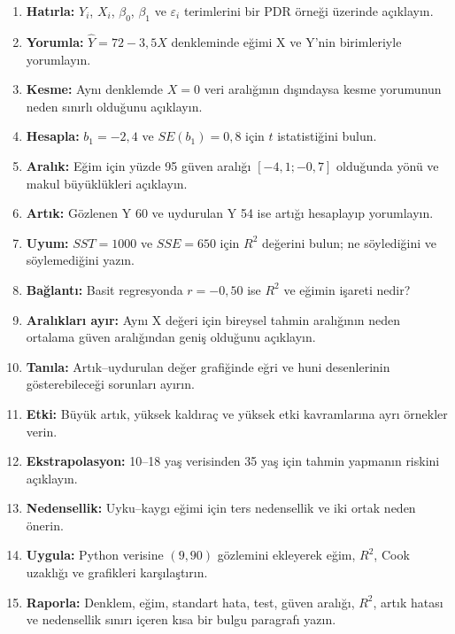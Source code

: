 \begin{enumerate}
\renewcommand{\labelenumi}{\textbf{\Alph{enumi}.}}
  \item \textbf{Hatırla:} $Y_i$, $X_i$, $\beta_0$, $\beta_1$ ve $\varepsilon_i$ terimlerini bir PDR örneği üzerinde açıklayın.
  \item \textbf{Yorumla:} $\widehat Y=72-3{,}5X$ denkleminde eğimi X ve Y'nin birimleriyle yorumlayın.
  \item \textbf{Kesme:} Aynı denklemde $X=0$ veri aralığının dışındaysa kesme yorumunun neden sınırlı olduğunu açıklayın.
  \item \textbf{Hesapla:} $b_1=-2{,}4$ ve $SE(b_1)=0{,}8$ için $t$ istatistiğini bulun.
  \item \textbf{Aralık:} Eğim için yüzde 95 güven aralığı $[-4{,}1;-0{,}7]$ olduğunda yönü ve makul büyüklükleri açıklayın.
  \item \textbf{Artık:} Gözlenen Y 60 ve uydurulan Y 54 ise artığı hesaplayıp yorumlayın.
  \item \textbf{Uyum:} $SST=1000$ ve $SSE=650$ için $R^2$ değerini bulun; ne söylediğini ve söylemediğini yazın.
  \item \textbf{Bağlantı:} Basit regresyonda $r=-0{,}50$ ise $R^2$ ve eğimin işareti nedir?
  \item \textbf{Aralıkları ayır:} Aynı X değeri için bireysel tahmin aralığının neden ortalama güven aralığından geniş olduğunu açıklayın.
  \item \textbf{Tanıla:} Artık--uydurulan değer grafiğinde eğri ve huni desenlerinin gösterebileceği sorunları ayırın.
  \item \textbf{Etki:} Büyük artık, yüksek kaldıraç ve yüksek etki kavramlarına ayrı örnekler verin.
  \item \textbf{Ekstrapolasyon:} 10--18 yaş verisinden 35 yaş için tahmin yapmanın riskini açıklayın.
  \item \textbf{Nedensellik:} Uyku--kaygı eğimi için ters nedensellik ve iki ortak neden önerin.
  \item \textbf{Uygula:} Python verisine $(9,90)$ gözlemini ekleyerek eğim, $R^2$, Cook uzaklığı ve grafikleri karşılaştırın.
  \item \textbf{Raporla:} Denklem, eğim, standart hata, test, güven aralığı, $R^2$, artık hatası ve nedensellik sınırı içeren kısa bir bulgu paragrafı yazın.
\end{enumerate}

